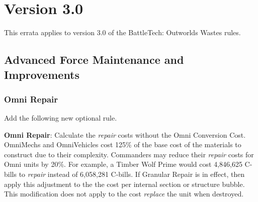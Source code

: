 \section{Version 3.0}

This errata applies to version 3.0 of the BattleTech: Outworlds Wastes rules.

\subsection{Advanced Force Maintenance and Improvements}

\subsubsection{Omni Repair}

Add the following new optional rule.

\begin{description}

\item {\bfseries Omni Repair}: Calculate the \emph{repair} costs without the Omni Conversion Cost.
OmniMechs and OmniVehicles cost 125\% of the base cost of the materials to construct due to their complexity.
Commanders may reduce their \emph{repair} costs for Omni units by 20\%.
For example, a Timber Wolf Prime would cost 4,846,625 C-bills to \emph{repair} instead of 6,058,281 C-bills.
If Granular Repair is in effect, then apply this adjustment to the the cost per internal section or structure bubble.
This modification does not apply to the cost \emph{replace} the unit when destroyed.

\end{description}
